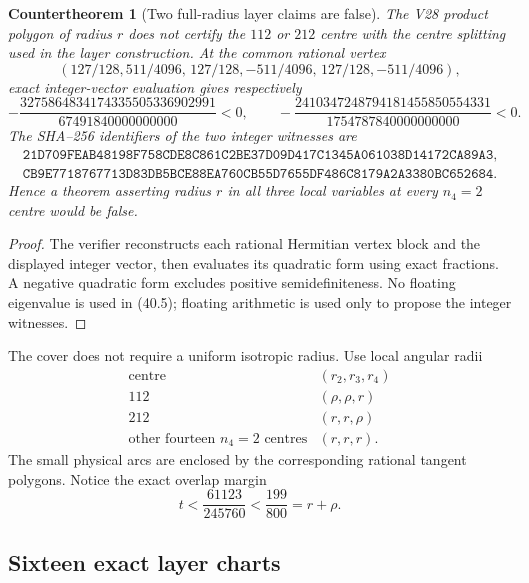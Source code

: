 \documentclass[11pt,oneside]{article}
\newtheorem{countertheorem}[theorem]{Countertheorem}
\theoremstyle{definition}
\theoremstyle{remark}
\begin{document}
\begin{countertheorem}[Two full-radius layer claims are false]
\label{cth:newv40-isotropic-failure}
The V28 product polygon of radius \(r\) does not certify the
\(112\) or \(212\) centre with the centre splitting used in the
layer construction.  At the common rational vertex
\[
 (127/128,511/4096,\,
  127/128,-511/4096,\,
  127/128,-511/4096),                                  \tag{40.4}
\]
exact integer-vector evaluation gives respectively
\[
 -\frac{3275864834174335505336902991}{67491840000000000}<0,
\qquad
 -\frac{2410347248794181455850554331}{1754787840000000000}<0.
                                                               \tag{40.5}
\]
The SHA--256 identifiers of the two integer witnesses are
\[
\begin{gathered}
\texttt{21D709FEAB48198F758CDE8C861C2BE37D09D417C1345A061038D14172CA89A3},\\
\texttt{CB9E7718767713D83DB5BCE88EA760CB55D7655DF486C8179A2A3380BC652684}.
\end{gathered}                                          \tag{40.6}
\]
Hence a theorem asserting radius \(r\) in all three local variables
at every \(n_4=2\) centre would be false.
\end{countertheorem}

\begin{proof}
The verifier reconstructs each rational Hermitian vertex block and
the displayed integer vector, then evaluates its quadratic form
using exact fractions.  A negative quadratic form excludes positive
semidefiniteness.  No floating eigenvalue is used in (40.5);
floating arithmetic is used only to propose the integer witnesses.
\end{proof}

The cover does not require a uniform isotropic radius.  Use local
angular radii
\[
\begin{array}{c|c}
\text{centre}&(r_2,r_3,r_4)\\ \hline
112&(\rho,\rho,r)\\
212&(r,r,\rho)\\
\text{other fourteen \(n_4=2\) centres}&(r,r,r).
\end{array}                                             \tag{40.7}
\]
The small physical arcs are enclosed by the corresponding rational
tangent polygons.  Notice the exact overlap margin
\[
 t<\frac{61123}{245760}
   <\frac{199}{800}=r+\rho.                             \tag{40.8}
\]

\subsection{Sixteen exact layer charts}
\end{document}
